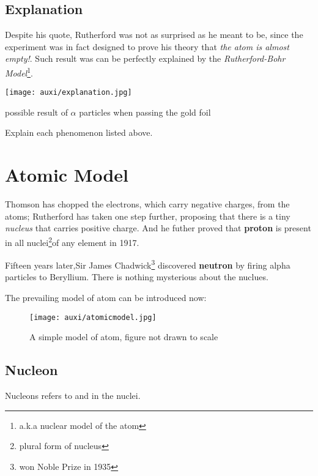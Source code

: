 \documentclass[a4paper]{tufte-handout}
\newenvironment{SummBox}
{\begin{tcolorbox}[breakable,colback=r1!30,colframe=r1,title=Summary]} {\end{tcolorbox}}
\begin{document}
\subsection{Explanation}
Despite his quote, Rutherford was not as surprised as he meant to be, since the experiment was in fact designed to prove his theory that \emph{the atom is almost empty!}. Such result was can be perfectly explained by the \emph{Rutherford-Bohr Model}\footnote{a.k.a nuclear model of the atom}.
\begin{marginfigure}
\centering
\texttt{[image: auxi/explanation.jpg]}
\caption{possible result of $\alpha$ particles when passing the gold foil}
\end{marginfigure}

\begin{SummBox}
Explain each phenomenon listed above.
\vspace{3in}
\end{SummBox}


\section{Atomic Model}
Thomson has chopped the electrons, which carry negative charges, from the atoms; Rutherford has taken one step further, proposing that there is a tiny \emph{nucleus} that carries positive charge. And he futher proved that \textbf{proton} is present in all nuclei\footnote{plural form of nucleus}of any element in 1917.

Fifteen years later,Sir James Chadwick\footnote{won Noble Prize in 1935} discovered \textbf{neutron} by firing alpha particles to Beryllium. There is nothing mysterious about the nuclues.

The prevailing model of atom can be introduced now:
\begin{figure}[h]
\centering
\texttt{[image: auxi/atomicmodel.jpg]}
\caption{A simple model of atom, figure not drawn to scale}
\end{figure}

\subsection{Nucleon}
Nucleons refers to \uline{\hspace{1in}} and \uline{\hspace{1in}} in the nuclei.
\end{document}
